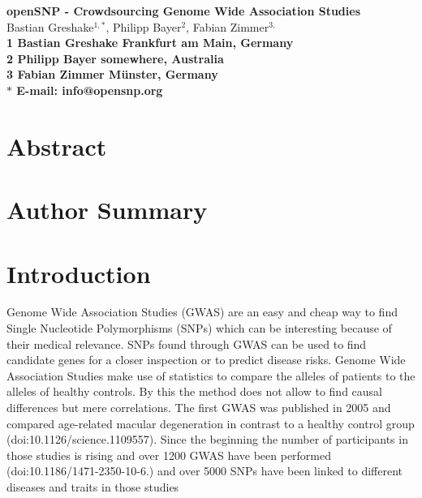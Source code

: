 \documentclass[10pt]{article}
\date{}
\begin{document}
\begin{flushleft}
{\Large
\textbf{openSNP - Crowdsourcing Genome Wide Association Studies}
}
\\
Bastian Greshake$^{1,\ast}$, 
Philipp Bayer$^{2}$, 
Fabian Zimmer$^{3,}$
\\
\bf{1} Bastian Greshake Frankfurt am Main, Germany
\\
\bf{2} Philipp Bayer somewhere, Australia
\\
\bf{3} Fabian Zimmer M\"unster, Germany
\\
$\ast$ E-mail: info@opensnp.org
\end{flushleft}

\section*{Abstract}

\section*{Author Summary}

\section*{Introduction}
Genome Wide Association Studies (GWAS) are an easy and cheap way to find Single Nucleotide Polymorphisms (SNPs) which can be interesting because of their medical relevance. SNPs found through GWAS can be used to find candidate genes for a closer inspection or to predict disease risks. Genome Wide Association Studies make use of statistics to compare the alleles of patients to the alleles of healthy controls. By this the method does not allow to find causal differences but mere correlations. The first GWAS was published in 2005 and compared age-related macular degeneration in contrast to a healthy control group (doi:10.1126/science.1109557). Since the beginning the number of participants in those studies is rising and over 1200 GWAS have been performed (doi:10.1186/1471-2350-10-6.) and over 5000 SNPs have been linked to different diseases and traits in those studies %
\end{document}

